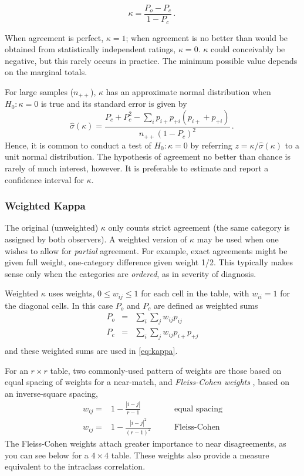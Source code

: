 \documentclass[11pt]{book}
\begin{document}
\begin{equation}\label{eq:kappa}
  \kappa =  \frac{ P_o - P_c } { 1 - P_c }
  \period
\end{equation}

When agreement is perfect, \(\kappa = 1\);  when agreement is no
better than would be obtained from statistically independent ratings,
$\kappa = 0$.
$\kappa$ could conceivably be negative, but this rarely occurs in practice.
The minimum possible value depends on the marginal totals.

For large samples ($n_{++}$), $\kappa$ has an approximate normal
distribution when $H_0 : \kappa = 0$ is true
and its standard error \citep{Fleiss:73,Fleiss-etal:69} is given by
\begin{equation*}
 \hat{\sigma}(\kappa) =  \frac{ P_c + P_c^2 - \sum_i p_{i+} p_{+i} (p_{i+} + p_{+i}) } { n_{++} (1 - P_c)^2 }
 \period
\end{equation*}
Hence, it is common to conduct a test of $H_0 : \kappa = 0$ by
referring $z = \kappa / \hat{\sigma}(\kappa)$
to a unit normal distribution.
The hypothesis of agreement no better than chance is rarely of much
interest, however.  It is preferable to estimate and report a
confidence interval for $\kappa$.

\subsubsection{Weighted Kappa}
The original (unweighted) \(\kappa\) only counts strict agreement (the same
category is assigned by both observers).  A weighted version of
\(\kappa\)
\citep{Cohen:68} may be used when one wishes to allow for \emph{partial} agreement.
For example, exact agreements might be given full weight,
one-category difference given weight 1/2.  This typically makes sense
only when the categories are \emph{ordered}, as in severity of
diagnosis.

Weighted \(\kappa\) uses weights, $0 \le w_{ij} \le 1$ for each cell in the
table, with $w_{ii} =1$ for the diagonal cells.
In this case $P_o$ and $P_c$ are defined as weighted sums
\begin{eqnarray*}
P_o  & = & \sum_i \sum_j w_{ij} p_{ij} \\
P_c  & = & \sum_i \sum_j w_{ij} p_{i+} p_{+j}\\
\end{eqnarray*}
and these weighted sums are used in \eqref{eq:kappa}.

For an $r \times r$ table, two commonly-used pattern of weights are those based on
equal spacing of weights
\citep{CicchettiAllison:71}
for a near-match,
and
\emph{Fleiss-Cohen weights}
\citep{FleissCohen:73}, based on an inverse-square
spacing,
\begin{eqnarray*}
w_{ij} = & 1 - \frac{|i-j|}{r-1} & \quad\quad\mbox{equal spacing} \\
w_{ij} = & 1 - \frac{|i-j|^2}{(r-1)^2} & \quad\quad\mbox{Fleiss-Cohen}
\end{eqnarray*}
The Fleiss-Cohen weights attach greater importance
to near disagreements, as you can see below for a $4 \times 4$ table.
These weights also provide a measure equivalent to the intraclass
correlation.
\end{document}

